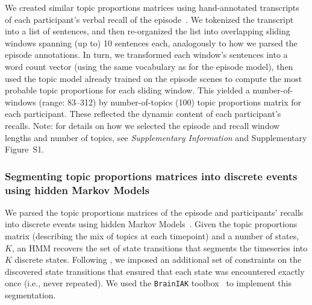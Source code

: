 \documentclass[10pt]{article}
\newcommand{\topicopt}{S1}
\begin{document}
We created similar topic proportions matrices using hand-annotated transcripts of each participant's verbal recall of the episode~\citep[annotated by][]{ChenEtal17}.  We tokenized the transcript into a list of sentences, and then re-organized the list into overlapping sliding windows spanning (up to) 10 sentences each, analogously to how we parsed the episode annotations.  In turn, we transformed each window's sentences into a word count vector (using the same vocabulary as for the episode model), then used the topic model already trained on the episode scenes to compute the most probable topic proportions for each sliding window.  This yielded a number-of-windows (range: 83--312) by number-of-topics (100) topic proportions matrix for each participant.  These reflected the dynamic content of each participant's recalls.  Note: for details on how we selected the episode and recall window lengths and number of topics, see \textit{Supplementary Information} and Supplementary Figure~\topicopt.


\subsubsection*{Segmenting topic proportions matrices into discrete events using hidden Markov Models}
We parsed the topic proportions matrices of the episode and participants' recalls into discrete events using hidden Markov Models~\citep[HMMs;][]{Rabi89}.  Given the topic proportions matrix (describing the mix of topics at each timepoint) and a number of states, $K$, an HMM recovers the set of state transitions that segments the timeseries into $K$ discrete states.  Following \cite{BaldEtal17}, we imposed an additional set of constraints on the discovered state transitions that ensured that each state was encountered exactly once (i.e., never repeated).  We used the \texttt{BrainIAK} toolbox~\citep{Brainiak} to implement this segmentation.
\end{document}
